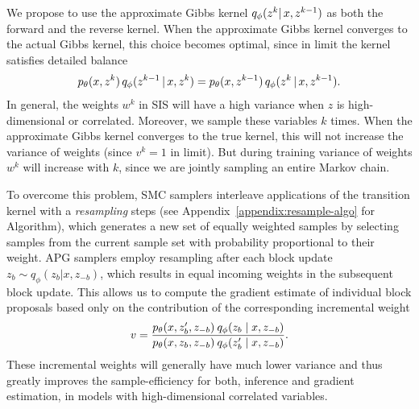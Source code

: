 \documentclass{article}
\theoremstyle{definition}
\begin{document}
We propose to use the approximate Gibbs kernel $q_\phi(z^k |\, x, z^{k-1})$ as both the forward and the reverse kernel. When the approximate Gibbs kernel converges to the actual Gibbs kernel, this choice becomes optimal, since in limit the kernel satisfies detailed balance 
\begin{align*}
    p_\theta(x, z^k) 
    \,
    q_\phi(z^{k-1} \,|\, x, z^{k})
    =
    p_\theta(x, z^{k-1}) 
    \,
    q_\phi(z^{k} \,|\, x, z^{k-1}).
\end{align*}
In general, the weights $w^k$ in SIS will have a high variance when $z$ is high-dimensional or correlated. Moreover, we sample these variables $k$ times. When the approximate Gibbs kernel converges to the true kernel, this will not increase the variance of weights (since $v^k=1$ in limit). But during training variance of weights $w^k$ will increase with $k$, since we are jointly sampling an entire Markov chain.



To overcome this problem, SMC samplers interleave applications of the transition kernel with a \emph{resampling} steps (see Appendix~\ref{appendix:resample-algo} for Algorithm), which generates a new set of equally weighted samples by selecting samples from the current sample set with probability proportional to their weight.
APG samplers employ resampling after each block update $z_b \sim q_\phi(z_b | x, z_{-b})$, which results in equal incoming weights in the subsequent block update. This allows us to compute the gradient estimate of individual block proposals based only on the contribution of the corresponding incremental weight 
\begin{align*}
    v
    = 
    \frac{p_\theta(x, z'_b, z_{-b}) \: q_\phi(z_b \mid  x, z_{-b})}
         {p_\theta(x, z_b, z_{-b}) \: q_\phi(z'_b \mid  x, z_{-b})}
    .
\end{align*}
These incremental weights will generally have much lower variance and thus greatly improves the sample-efficiency for both, inference and gradient estimation, in models with high-dimensional correlated variables.
\end{document}
